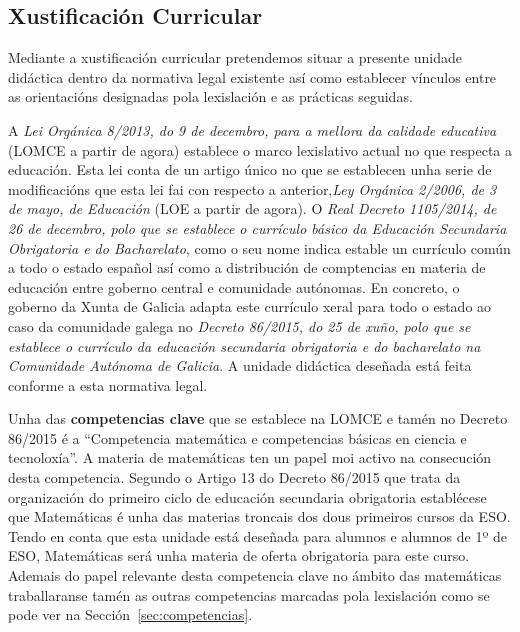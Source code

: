 \subsection{Xustificación Curricular}
Mediante a xustificación curricular pretendemos situar a presente unidade didáctica dentro da normativa legal existente así como establecer vínculos entre as orientacións designadas pola lexislación e as prácticas seguidas.

A \emph{Lei Orgánica 8/2013, do 9 de decembro, para a mellora da calidade educativa} (LOMCE a partir de agora) establece o marco lexislativo actual no que respecta a educación. Esta lei conta de un artigo único no que se establecen unha serie de modificacións que esta lei fai con respecto a anterior,\emph{Ley Orgánica 2/2006, de 3 de mayo, de Educación} (LOE a partir de agora). O \emph{Real Decreto 1105/2014, de 26 de decembro, polo que se establece o currículo básico da Educación Secundaria Obrigatoria e do Bacharelato}, como o seu nome indica estable un currículo común a todo o estado español así como a distribución de comptencias en materia de educación entre goberno central e comunidade autónomas. En concreto, o goberno da Xunta de Galicia adapta este currículo xeral para todo o estado ao caso da comunidade galega no \emph{Decreto 86/2015, do 25 de xuño, polo que se establece o currículo da educación secundaria obrigatoria e do bacharelato na Comunidade Autónoma de Galicia}. A unidade didáctica deseñada está feita conforme a esta normativa legal.

Unha das \textbf{competencias clave} que se establece na LOMCE e tamén no Decreto 86/2015 é a ``Competencia matemática e competencias básicas en ciencia e tecnoloxía''. A materia de matemáticas ten un papel moi activo na consecución desta competencia. Segundo o Artigo 13 do Decreto 86/2015 que trata da organización do primeiro ciclo de educación secundaria obrigatoria establécese que Matemáticas é unha das materias troncais dos dous primeiros cursos da ESO. Tendo en conta que esta unidade está deseñada para alumnos e alumnos de 1º de ESO, Matemáticas será unha materia de oferta obrigatoria para este curso. Ademais do papel relevante desta competencia clave no ámbito das matemáticas traballaranse tamén as outras competencias marcadas pola lexislación como se pode ver na Sección~\ref{sec:competencias}.


